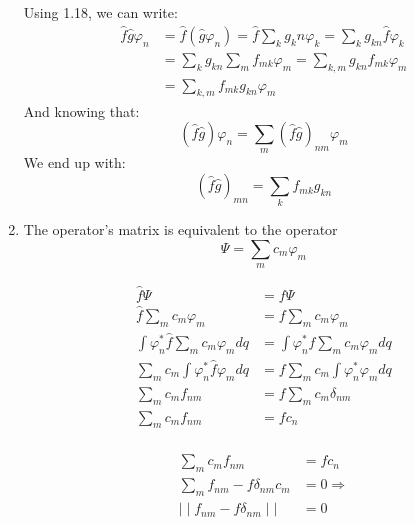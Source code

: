 \begin{enumerate}
						Using 1.18, we can write:
						\begin{align}
							\hat{f}\hat{g}\varphi_n &= \hat{f}(\hat{g}\varphi_n) = \hat{f} \sum_k g_kn \varphi_k = \sum_k g_{kn} \hat{f} \varphi_k \nonumber \\
							&= \sum_k g_{kn} \sum_m f_{mk} \varphi_m = \sum_{k,m} g_{kn}f_{mk}\varphi_m \nonumber \\ 
							&= \sum_{k,m} f_{mk}g_{kn}\varphi_m
						\end{align}
						And knowing that:
						\begin{equation}
							(\hat{f}\hat{g})\varphi_n = \sum_m(\hat{f}\hat{g})_{nm}\varphi_m
						\end{equation}
						We end up with:
						\begin{equation}
							(\hat{f}\hat{g})_{mn} = \sum_k f_{mk}g_{kn}
							\label{fgproduct}
						\end{equation}
						
					\item The operator's matrix is equivalent to the operator
						\begin{equation}
							\Psi = \sum_m c_m \varphi_m
						\end{equation}
						
						\begin{align}
							\hat{f} \Psi &= f \Psi \\
							\hat{f}\sum_m c_m \varphi_m &= f\sum_m c_m \varphi_m \nonumber \\
							\int \varphi_n^* \hat{f}\sum_m c_m \varphi_m dq &=  \int \varphi_n^* f\sum_m c_m \varphi_m dq\nonumber \\
							\sum_m c_m \int \varphi_n^* \hat{f} \varphi_m dq &= f \sum_m c_m \int \varphi_n^* \varphi_m dq \nonumber \\
							\sum_m c_m f_{nm} &= f \sum_m c_m \delta_{nm} \nonumber \\
							\sum_m c_m f_{nm} &= f c_n \\							
						\end{align}
						
						\begin{align}
							\sum_m c_m f_{nm} &= f c_n \nonumber\\
							\sum_m f_{nm} - f \delta_{nm} c_m &= 0 \Rightarrow \nonumber\\
							\mid\mid f_{nm} - f\delta_{nm}\mid\mid &= 0 \\
						\end{align}
					
				\end{enumerate}
	
